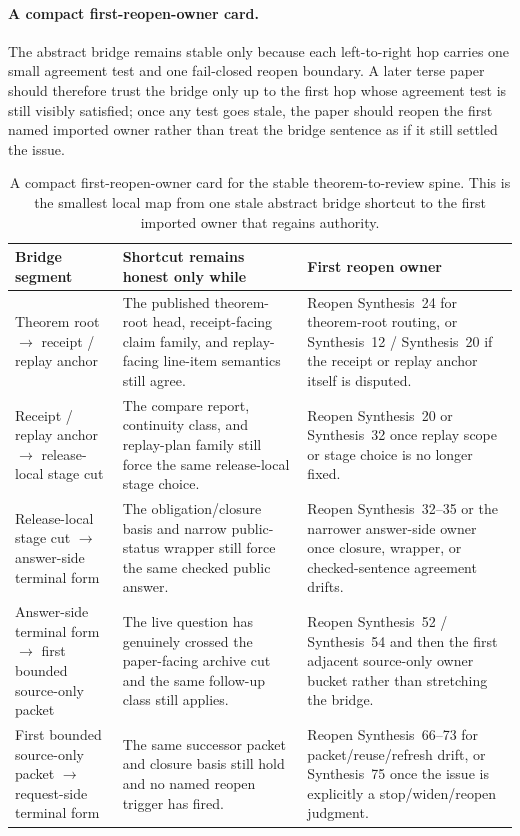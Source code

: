 \documentclass[11pt]{article}
\begin{document}
\paragraph{A compact first-reopen-owner card.}
The abstract bridge remains stable only because each left-to-right hop carries one small agreement test and one fail-closed reopen boundary.
A later terse paper should therefore trust the bridge only up to the first hop whose agreement test is still visibly satisfied; once any test goes stale, the paper should reopen the first named imported owner rather than treat the bridge sentence as if it still settled the issue.

\begin{table}[t]
\centering
\small
\begin{tabularx}{\linewidth}{@{}L Y Y@{}}
\toprule
Bridge segment & Shortcut remains honest only while & First reopen owner \\
\midrule
Theorem root $\to$ receipt / replay anchor & The published theorem-root head, receipt-facing claim family, and replay-facing line-item semantics still agree. & Reopen Synthesis~24 for theorem-root routing, or Synthesis~12 / Synthesis~20 if the receipt or replay anchor itself is disputed. \\
Receipt / replay anchor $\to$ release-local stage cut & The compare report, continuity class, and replay-plan family still force the same release-local stage choice. & Reopen Synthesis~20 or Synthesis~32 once replay scope or stage choice is no longer fixed. \\
Release-local stage cut $\to$ answer-side terminal form & The obligation/closure basis and narrow public-status wrapper still force the same checked public answer. & Reopen Synthesis~32--35 or the narrower answer-side owner once closure, wrapper, or checked-sentence agreement drifts. \\
Answer-side terminal form $\to$ first bounded source-only packet & The live question has genuinely crossed the paper-facing archive cut and the same follow-up class still applies. & Reopen Synthesis~52 / Synthesis~54 and then the first adjacent source-only owner bucket rather than stretching the bridge. \\
First bounded source-only packet $\to$ request-side terminal form & The same successor packet and closure basis still hold and no named reopen trigger has fired. & Reopen Synthesis~66--73 for packet/reuse/refresh drift, or Synthesis~75 once the issue is explicitly a stop/widen/reopen judgment. \\
\bottomrule
\end{tabularx}
\caption{A compact first-reopen-owner card for the stable theorem-to-review spine. This is the smallest local map from one stale abstract bridge shortcut to the first imported owner that regains authority.}
\label{tab:seriesspine-first-reopen-owner-card}
\end{table}
\end{document}
